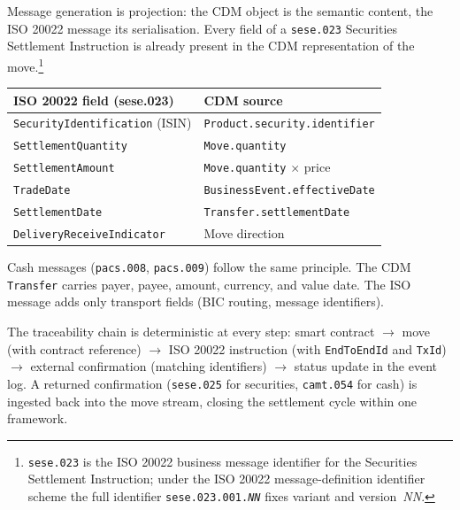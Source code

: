 Message generation is projection: the CDM object is the semantic content, the ISO 20022 message its serialisation. Every field of a \texttt{sese.023} Securities Settlement Instruction is already present in the CDM representation of the move.\footnote{\texttt{sese.023} is the ISO 20022 business message identifier for the Securities Settlement Instruction; under the ISO 20022 message-definition identifier scheme the full identifier \texttt{sese.023.001.\textit{NN}} fixes variant and version~\textit{NN}.}

\begin{center}
\begin{tabular}{l l}
\toprule
\textbf{ISO 20022 field (sese.023)} & \textbf{CDM source} \\
\midrule
\texttt{SecurityIdentification} (ISIN) & \texttt{Product.security.identifier} \\
\texttt{SettlementQuantity}            & \texttt{Move.quantity} \\
\texttt{SettlementAmount}              & \texttt{Move.quantity} $\times$ price \\
\texttt{TradeDate}                     & \texttt{BusinessEvent.effectiveDate} \\
\texttt{SettlementDate}                & \texttt{Transfer.settlementDate} \\
\texttt{DeliveryReceiveIndicator}      & Move direction \\
\bottomrule
\end{tabular}
\end{center}

Cash messages (\texttt{pacs.008}, \texttt{pacs.009}) follow the same principle. The CDM \texttt{Transfer} carries payer, payee, amount, currency, and value date. The ISO message adds only transport fields (BIC routing, message identifiers).

The traceability chain is deterministic at every step: smart contract $\to$ move (with contract reference) $\to$ ISO 20022 instruction (with \texttt{EndToEndId} and \texttt{TxId}) $\to$ external confirmation (matching identifiers) $\to$ status update in the event log. A returned confirmation (\texttt{sese.025} for securities, \texttt{camt.054} for cash) is ingested back into the move stream, closing the settlement cycle within one framework.


